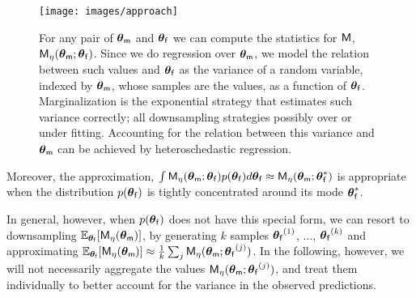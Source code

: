 \documentclass[runningheads,a4paper]{llncs}
\newcommand{\bM}{{\sf{M}}}
\newcommand{\bm}{{\sf{m}}}
\newcommand{\pfpar}{\bth_{\sf{f}}}
\newcommand{\pmpar}{\bth_{\sf{m}}}
\newcommand{\tstat}{\eta} %
\newcommand{\bth}{\boldsymbol{\theta}}
\begin{document}
 \begin{SCfigure}[][t]
\texttt{[image: images/approach]}
\caption{For any pair of $\bth_{\bm}$ and $\pfpar$ we can compute the statistics for $\bM$, $\bM_{\tstat}(\bth_{\bm}; \pfpar)$. Since we do regression over $\bth_{\bm}$, we   model the relation between such values and $\pfpar$  as the variance of a random variable, indexed by $\bth_{\bm}$, whose samples are the values, as a function of $\pfpar$. 
Marginalization is the exponential strategy that  estimates  such variance  correctly; all downsampling strategies possibly over or under fitting. Accounting for the relation between this  variance and  $\bth_{\bm}$  can be achieved by heteroschedastic regression.
}
\label{fig:marg}
\end{SCfigure}
 
Moreover, the approximation,
$\int \bM_{\tstat}(\bth_{\bm}; \pfpar)p(\pfpar) d\pfpar \approx \bM_{\tstat}(\bth_{\bm};\pfpar^*)
$ 
is appropriate when the distribution $p(\pfpar)$ is tightly concentrated around its mode $\pfpar^*$. 

In general, however,  when $p(\pfpar)$ does not have this special form, we can resort to  downsampling $\mathbb{E}_{\pfpar}[\bM_{\tstat}(\pmpar)]$, by generating $k$  samples ${\pfpar}^{(1)}$, $\ldots$, ${\pfpar}^{(k)}$ and approximating   $\mathbb{E}_{\pfpar}[\bM_{\tstat}(\pmpar)] \approx \frac{1}{k} \sum_j \bM_{\tstat}(\pmpar;{\pfpar}^{(j)})$. In the following, however, we will not necessarily aggregate the values $\bM_{\tstat}(\pmpar;{\pfpar}^{(j)})$, and treat them individually to better account for the variance in the observed predictions.
\end{document}
